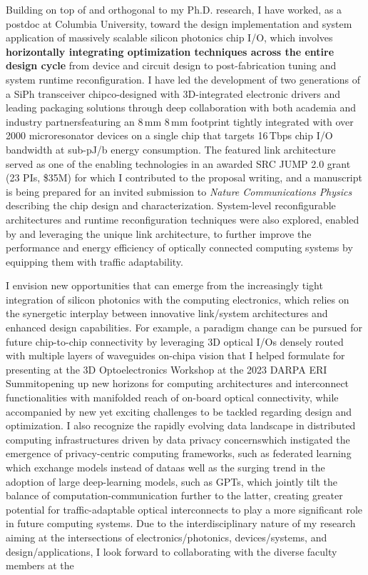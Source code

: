 Building on top of and orthogonal to my Ph.D. research, I have worked, as a postdoc at Columbia University, toward the design implementation and system application of massively scalable silicon photonics chip I/O, which involves \textbf{horizontally integrating optimization techniques across the entire design cycle} from device and circuit design to post-fabrication tuning and system runtime reconfiguration. I have led the development of two generations of a SiPh transceiver chip\textemdash co-designed with 3D-integrated electronic drivers and leading packaging solutions through deep collaboration with both academia and industry partners\textemdash featuring an 8\,mm \texttimes{} 8\,mm footprint tightly integrated with over 2000 microresonator devices on a single chip that targets 16\,Tbps chip I/O bandwidth at sub-pJ/b energy consumption. The featured link architecture served as one of the enabling technologies in an awarded SRC JUMP 2.0 grant (23 PIs, \$35M) for which I contributed to the proposal writing, and a manuscript is being prepared for an invited submission to \emph{Nature Communications Physics} describing the chip design and characterization. System-level reconfigurable architectures and runtime reconfiguration techniques were also explored, enabled by and leveraging the unique link architecture, to further improve the performance and energy efficiency of optically connected computing systems by equipping them with traffic adaptability.

I envision new opportunities that can emerge from the increasingly tight integration of silicon photonics with the computing electronics, which relies on the synergetic interplay between innovative link/system architectures and enhanced design capabilities. For example, a paradigm change can be pursued for future chip-to-chip connectivity by leveraging 3D optical I/Os densely routed with multiple layers of waveguides on-chip\textemdash a vision that I helped formulate for presenting at the 3D Optoelectronics Workshop at the 2023 DARPA ERI Summit\textemdash opening up new horizons for
computing architectures and interconnect functionalities with manifolded reach of on-board optical connectivity, while accompanied by new yet exciting challenges to be tackled regarding design and optimization. I also recognize the rapidly evolving data landscape in distributed computing infrastructures driven by data privacy concerns\textemdash which instigated the emergence of privacy-centric computing frameworks, such as federated learning which exchange models instead of data\textemdash as well as the surging trend in the adoption of large deep-learning models, such as GPTs, which jointly tilt the balance of computation-communication further to the latter, creating greater potential for traffic-adaptable optical interconnects to play a more significant role in future computing systems. Due to the interdisciplinary nature of my research aiming at the intersections of electronics/photonics, devices/systems, and design/applications, I look forward to collaborating with the diverse faculty members at the \appSchool{}%